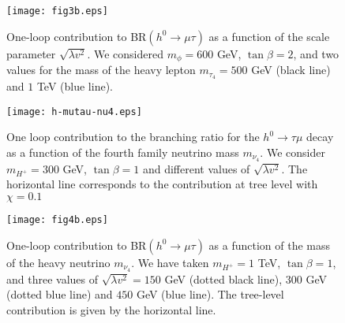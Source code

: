 \documentclass[a4paper]{jpconf}
\begin{document}
\begin{figure}[!hbt]
\centering
\texttt{[image: fig3b.eps]}
\caption{One-loop contribution to BR$(h^0\to \mu\tau)$ as a function of the scale parameter $\sqrt{\lambda v^2}$. We considered $m_\phi=600$ GeV, $\tan\beta=2$, and two values for the mass of the heavy lepton $m_{\tau_4}=500$ GeV (black line) and $ 1 $ TeV (blue line).}
\label{fig3b}
\end{figure}

\begin{figure}[!hbt]
\centering
\texttt{[image: h-mutau-nu4.eps]}
\caption{One loop contribution to the branching ratio for the $h^0\to \tau \mu$ decay as a function of the fourth family neutrino mass $m_{\nu_4}$. We consider $m_{H^{+}}=300$ GeV, $\tan\beta=1$ and different values of $\sqrt{\lambda v^2}$. The horizontal line corresponds to the contribution at tree level with $\chi=0.1$}
\label{h-mutau-m4}
\end{figure}

\begin{figure}[!hbt]
\centering
\texttt{[image: fig4b.eps]}
\caption{One-loop contribution to BR$(h^0\to \mu\tau)$ as a function of the mass of the heavy neutrino $m_{\nu_4}$. We have taken $m_{H^{+}}=1$ TeV, $\tan\beta=1$, and three values of $\sqrt{\lambda v^2}=150$ GeV (dotted black line), $ 300 $ GeV (dotted blue line) and $ 450 $ GeV (blue line). The tree-level contribution is given by the horizontal line.}
\label{fig4b}
\end{figure}
\end{document}
